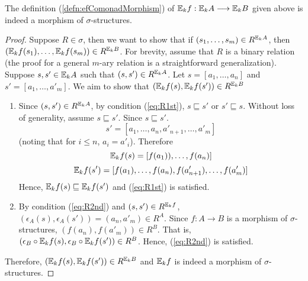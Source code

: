 \begin{prop}
The definition (\ref{defn:efComonadMorphism}) of ${\mathbb{E}_{k}f}:{\mathbb{E}_{k}A} \longrightarrow {\mathbb{E}_{k}B}$ given above is indeed a morphism of $\sigma$-structures. 
\begin{proof}
Suppose $R \in \sigma$, then we want to show that if $(s_{1},\dots,s_{m}) \in R^{{\mathbb{E}_{k}A}}$, then \linebreak $({\mathbb{E}_{k}f}(s_{1}),\dots,{\mathbb{E}_{k}f}(s_{m})) \in R^{{\mathbb{E}_{k}B}}$. For brevity, assume that $R$ is a binary relation (the proof for a general $m$-ary relation is a straightforward generalization). Suppose $s,s' \in {\mathbb{E}_{k}A}$ such that $(s,s') \in R^{{\mathbb{E}_{k}A}}$. Let $s = [a_{1},\dots,a_{n}]$ and $s' = [a_{1},\dots,a'_{m}]$. We aim to show that $({\mathbb{E}_{k}f}(s),{\mathbb{E}_{k}f}(s')) \in R^{{\mathbb{E}_{k}B}}$ \\
\begin{enumerate}
\item  Since $(s,s') \in R^{{\mathbb{E}_{k}A}}$, by condition (\ref{eq:R1st}), $s \sqsubseteq s'$ or $s' \sqsubseteq s$. Without loss of generality, assume $s \sqsubseteq s'$. Since $s \sqsubseteq s'$.
$$s' = [a_{1},\dots,a_{n},a'_{n+1},\dots,a'_{m}]$$ 
(noting that for $i \leq n$, $a_{i} = a'_{i}$). Therefore $${\mathbb{E}_{k}f}(s) = [f(a_{1})),\dots,f(a_{n})]$$ 
$${\mathbb{E}_{k}f}(s') =[f(a_{1}),\dots,f(a_{n}),f(a'_{n+1}),\dots,f(a'_{m})]$$ 
Hence, ${\mathbb{E}_{k}f}(s) \sqsubseteq {\mathbb{E}_{k}f}(s')$ and (\ref{eq:R1st}) is satisfied. 
\item  By condition (\ref{eq:R2nd}) and $(s,s') \in R^{{\mathbb{E}_{k}f}}$, $(\epsilon_{A}(s),\epsilon_{A}(s')) = (a_{n},a'_{m}) \in R^{A}$. Since $f:A \rightarrow B$ is a morphism of $\sigma$-structures, $(f(a_{n}),f(a'_{m})) \in R^{B}$. That is, $(\epsilon_{B}\circ {\mathbb{E}_{k}f}(s),\epsilon_{B} \circ {\mathbb{E}_{k}f}(s')) \in R^{B}$. Hence, (\ref{eq:R2nd}) is satisfied.
\end{enumerate}
Therefore, $({\mathbb{E}_{k}f}(s),{\mathbb{E}_{k}f}(s')) \in R^{{\mathbb{E}_{k}B}}$ and ${\mathbb{E}_{k}f}$ is indeed a morphism of $\sigma$-structures. 
\end{proof}
\end{prop}
